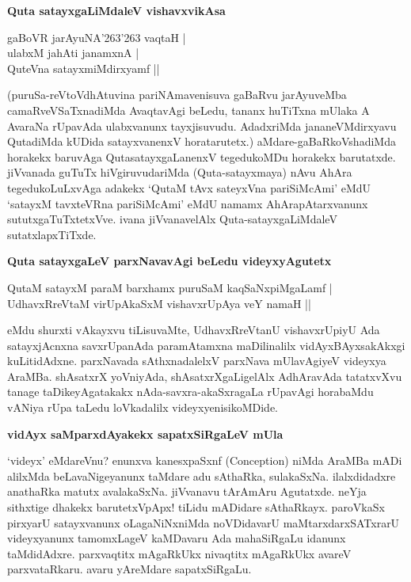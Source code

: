 {\bigskip
\noindent
{\large\bf Quta satayxgaLiMdaleV vishavxvikAsa}}\label{page87a}
\medskip

\begin{shloka}
gaBoVR jarAyuNA\char'263\char'263 vaqtaH |\\\label{87a}
ulabxM ja{hA}ti janamxnA |\\
QuteVna satayxmiMdirxyamf ||
\end{shloka}

\noindent
(puruSa-reVtoVdhAtuvina pariNAmavenisuva gaBaRvu jarAyuveMba camaRveVSaTxnadiMda AvaqtavAgi beLedu, tananx huTiTxna mUlaka A AvaraNa rUpavAda ulabxvanunx tayxjisuvudu. AdadxriMda jananeVMdirxyavu QutadiMda kUDida satayxvanenxV horatarutetx.) aMdare-gaBaRkoVshadiMda horakekx baruvAga QutasatayxgaLanenxV tegedukoMDu horakekx barutatxde. jiVvanada guTuTx hiVgiruvudariMda (Quta-satayxmaya) nAvu AhAra tegedukoLuLxvAga adakekx `QutaM tAvx sateyxVna pariSiMcAmi' eMdU `satayxM tavxteVRna pariSiMcAmi'\label{87b} eMdU namamx AhArapAtarxvanunx sututxgaTuTxtetxVve. ivana jiVvanavelAlx Quta-satayxgaLiMdaleV sutatxlapxTiTxde.

{\bigskip
\noindent
{\large\bf Quta satayxgaLeV parxNavavAgi beLedu videyxyAgutetx}}\label{page87b}
\smallskip

\begin{shloka}
QutaM satayxM paraM barxhamx puruSaM kaqSaNxpiMgaLamf |\\\label{87c}
UdhavxRreVtaM virUpAkaSxM vishavxrUpAya veY namaH ||
\end{shloka}

\noindent
eMdu shurxti vAkayxvu tiLisuvaMte, UdhavxRreVtanU vishavxrUpiyU Ada satayxjAcnxna savxrUpanAda paramAtamxna maDilinalilx vidAyxBAyxsakAkxgi kuLitidAdxne. parxNavada sAthxnadalelxV parxNava mUlavAgiyeV videyxya AraMBa. shAsatxrX yoVniyAda, shAsatxrXgaLigelAlx AdhAravAda tatatxvXvu tanage taDikeyAgatakakx nAda-savxra-akaSxragaLa rUpavAgi horabaMdu vANiya rUpa taLedu loVkadalilx videyxyenisikoMDide.

{\bigskip
\noindent
{\large\bf vidAyx saMparxdAyakekx sapatxSiRgaLeV mUla}}\label{page88}
\medskip

\noindent
`videyx' eMdareVnu? enunxva kanesxpaSxnf ({\rm Conception}) niMda AraMBa mADi alilxMda beLavaNigeyanunx taMdare adu sAthaRka, sulakaSxNa. ilalxdidadxre anathaRka matutx avalakaSxNa. jiVvanavu tArAmAru Agutatxde. neYja sithxtige dhakekx barutetxVpApx! tiLidu mADidare sAthaRkayx. paroVkaSx pirxyarU satayxvanunx oLagaNiNxniMda noVDidavarU maMtarxdarxSATxrarU videyxyanunx tamomxLageV kaMDavaru Ada mahaSiRgaLu idanunx taMdidAdxre. parxvaqtitx mAgaRkUkx nivaqtitx mAgaRkUkx avareV parxvataRkaru. avaru yAreMdare sapatxSiRgaLu.

